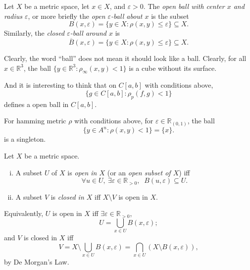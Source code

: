 \begin{definition}
	Let $X$ be a metric space, let $x \in X$, and $\varepsilon > 0$. The \textit{open ball with center $x$ and radius $\varepsilon$}, or more briefly the \textit{open $\varepsilon$-ball about $x$} is the subset
	$$
	B(x, \varepsilon) = \{ y \in X: \rho (x,y) \le \varepsilon \} \subseteq X.
	$$
	Similarly, the \textit{closed $\varepsilon$-ball around $x$} is
	$$
	\overline B (x, \varepsilon) = \{ y \in X: \rho(x,y) \le \varepsilon \} \subseteq X.
	$$
\end{definition}


\begin{note}
	Clearly, the word ``ball'' does not mean it should look like a ball. Clearly, for all $x \in \mathbb R^3$, the ball $\{ y \in \mathbb R^3 : \rho_\infty (x,y) < 1 \}$ is a cube without its surface.
	
	And it is interesting to think that on $C[a,b]$ with conditions above,
	$$
	\{ g \in C[a,b] : \rho_p(f,g) < 1 \}
	$$
	defines a open ball in $C[a,b]$.
	
	
\end{note}


\begin{note}
	For hamming metric $\rho$ with conditions above, for $\varepsilon \in \mathbb R_{(0,1)}$, the ball
	$$
	\{ y \in A^n : \rho(x,y) < 1 \} = \{x\}.
	$$
	is a singleton.
\end{note}


\begin{definition}
	Let $X$ be a metric space.
	\begin{enumerate}[(i)]
		\item A subset $U$ of $X$ is \textit{open in $X$} (or an \textit{open subset of $X$}) iff
		$$
		\forall u \in U, \ \exists \varepsilon \in \mathbb R_{> 0} , \;\; B(u, \varepsilon ) \subseteq U.
		$$
		\item A subset $V$ is \textit{closed in $X$} iff $X\setminus V$ is open in $X$.
	\end{enumerate}
\end{definition}


\begin{note}
	Equivalently, $U$ is open in $X$ iff $\exists \varepsilon \in \mathbb R_{>0}$,
	$$
	U = \bigcup_{x \in U} B(x, \varepsilon );
	$$
	and $V$ is closed in $X$ iff
	$$
	V = X \setminus \bigcup_{x \in U} B(x, \varepsilon) = \bigcap_{x \in U} (X \setminus B(x, \varepsilon)),
	$$
	by De Morgan's Law.
\end{note}


